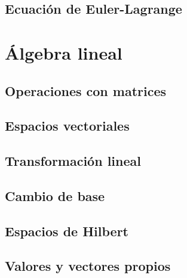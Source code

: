 \subsection{Ecuación de Euler-Lagrange}

\section{Álgebra lineal}
\subsection{Operaciones con matrices}
\subsection{Espacios vectoriales}
\subsection{Transformación lineal}
\subsection{Cambio de base}
\subsection{Espacios de Hilbert}
\subsection{Valores y vectores propios}